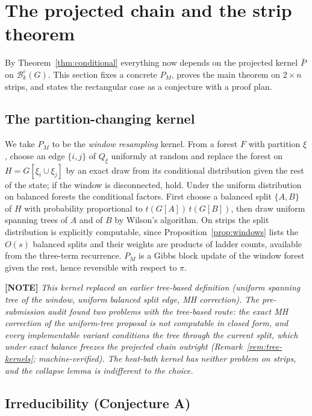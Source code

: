 \documentclass[11pt]{article}
\newcommand{\statusnote}[1]{\medskip\noindent\textcolor{notecol}{\textbf{[NOTE]} \emph{#1}}\medskip}
\newcommand{\Bcal}{\mathcal{B}}
\begin{document}
\section{The projected chain and the strip theorem}
\label{sec:targets}

By Theorem~\ref{thm:conditional} everything now depends on the
projected kernel $\bar P$ on $\Bcal_k^\varepsilon(G)$. This section
fixes a concrete $P_M$, proves the main theorem on $2 \times n$ strips,
and states the rectangular case as a conjecture with a proof plan.

\subsection{The partition-changing kernel}
\label{subsec:pm}

We take $P_M$ to be the \emph{window resampling} kernel. From a forest
$F$ with partition $\xi$, choose an edge $\{i, j\}$ of $Q_\xi$ uniformly
at random and replace the forest on $H = G[\xi_i \cup \xi_j]$ by an exact
draw from its conditional distribution given the rest of the state; if
the window is disconnected, hold. Under the uniform distribution on
balanced forests the conditional factors. First choose a balanced split
$\{A, B\}$ of $H$ with probability proportional to $t(G[A])\, t(G[B])$,
then draw uniform spanning trees of $A$ and of $B$ by Wilson's
algorithm. On strips the split distribution is explicitly computable,
since Proposition~\ref{prop:windows} lists the $O(s)$ balanced splits
and their weights are products of ladder counts, available from the
three-term recurrence. $P_M$ is a Gibbs block update of the window
forest given the rest, hence reversible with respect to $\pi$.

\statusnote{This kernel replaced an earlier tree-based definition
(uniform spanning tree of the window, uniform balanced split edge, MH
correction). The pre-submission audit found two problems with the
tree-based route: the exact MH correction of the uniform-tree proposal
is not computable in closed form, and every implementable variant
conditions the tree through the current split, which under exact balance
freezes the projected chain outright
(Remark~\ref{rem:tree-kernels}; machine-verified). The heat-bath kernel
has neither problem on strips, and the collapse lemma is indifferent to
the choice.}

\subsection{Irreducibility (Conjecture A)}
\end{document}
